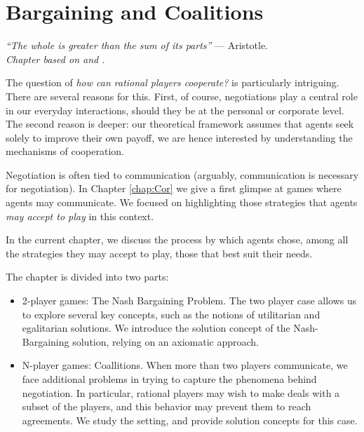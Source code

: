 

\ifx \globalmark \undefined %
	
\else
\fi




\chapter{Bargaining and Coalitions}
{\large{\itshape
``The whole is greater than the sum of its parts''} --- Aristotle.\\
}
\label{chap:Bar}
{\small{\itshape
Chapter based on \cite[pages 370 - 390 and 417 - 444]{MyGTAO} and \cite[Chapter 12]{ShLeMSAG}.}\\
}


The question of \emph{how can rational players cooperate?} is particularly intriguing. There are several reasons for this. First, of course, negotiations play a central role in our everyday interactions, should they be at the personal or corporate level. The second reason is deeper: our theoretical framework assumes that agents seek solely to improve their own payoff, we are hence interested by understanding the mechanisms of cooperation.

Negotiation is often tied to communication (arguably, communication is necessary for negotiation). In Chapter \ref{chap:Cor} we give a first glimpse at games where agents may communicate. We focused on highlighting those strategies that agents \emph{may accept to play} in this context.

In the current chapter, we discuss the process by which agents chose, among all the strategies they may accept to play, those that best suit their needs.

The chapter is divided into two parts:
\begin{itemize}
\item 2-player games: The Nash Bargaining Problem. The two player case allows us to explore several key concepts, such as the notions of utilitarian and egalitarian solutions. We introduce the solution concept of the Nash-Bargaining solution, relying on an axiomatic approach.
\item N-player games: Coallitions. When more than two players communicate, we face additional problems in trying to capture the phenomena behind negotiation. In particular, rational players may wish to make deals with a subset of the players, and this behavior may prevent them to reach agreements. We study the setting, and provide solution concepts for this case.
\end{itemize}




